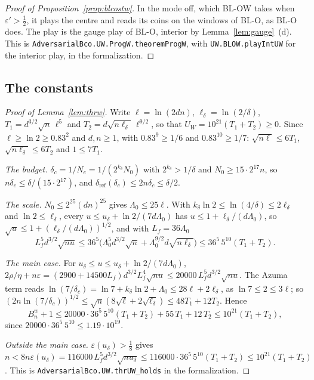 \documentclass[11pt]{amsart}
\theoremstyle{definition}
\numberwithin{equation}{section}
\begin{document}
\begin{proof}[Proof of Proposition~\ref{prop:blcostw}]
In the mode off, which BL-OW takes when $\varepsilon'>\frac12$, it plays the centre and reads its coins on the windows of BL-O, as BL-O does. The play is the gauge play of BL-O, interior by Lemma~\ref{lem:gauge}~(d). This is \texttt{AdversarialBco.\allowbreak UW.\allowbreak ProgW.\allowbreak theoremProgW}, with \texttt{UW.\allowbreak BLOW.\allowbreak playIntUW} for the interior play, in the formalization.
\end{proof}

\subsection*{The constants}

\begin{proof}[Proof of Lemma~\ref{lem:thrw}]
Write $\ell=\ln(2dn)$, $\ell_\delta=\ln(2/\delta)$, $T_1=d^{3/2}\sqrt n\,\ell^5$ and $T_2=d\sqrt{n\ell_\delta}\,\ell^{9/2}$, so that $U_W=10^{21}(T_1+T_2)\ge0$. Since $\ell\ge\ln2\ge0.83^2$ and $d,n\ge1$, with $0.83^9\ge1/6$ and $0.83^{10}\ge1/7$: $\sqrt{n\ell}\le6T_1$, $\sqrt{n\ell_\delta}\le6T_2$ and $1\le7T_1$.

\emph{The budget.} $\delta_c=1/N_e=1/(2^{k_\delta}N_0)$ with $2^{k_\delta}>1/\delta$ and $N_0\ge15\cdot2^{17}n$, so $n\delta_c\le\delta/(15\cdot2^{17})$, and $\delta_{\mathrm{ref}}(\delta_c)\le2n\delta_c\le\delta/2$.

\emph{The scale.} $N_0\le2^{25}(dn)^{25}$ gives $\Lambda_0\le25\ell$. With $k_\delta\ln2\le\ln(4/\delta)\le2\ell_\delta$ and $\ln2\le\ell_\delta$, every $u\le u_\delta+\ln2/(7d\Lambda_0)$ has $u\le1+\ell_\delta/(d\Lambda_0)$, so $\sqrt u\le1+(\ell_\delta/(d\Lambda_0))^{1/2}$, and with $L_f=36\Lambda_0$
\[
L_f^5d^{3/2}\sqrt{nu}\le36^5\bigl(\Lambda_0^5d^{3/2}\sqrt n+\Lambda_0^{9/2}d\sqrt{n\ell_\delta}\bigr)\le36^5\,5^{10}(T_1+T_2).
\]

\emph{The main case.} For $u_\delta\le u\le u_\delta+\ln2/(7d\Lambda_0)$, $2\rho/\eta+n\varepsilon=(2900+14500L_f)d^{3/2}L_f^4\sqrt{nu}\le20000\,L_f^5d^{3/2}\sqrt{nu}$. The Azuma term reads $\ln(7/\delta_c)=\ln7+k_\delta\ln2+\Lambda_0\le28\ell+2\ell_\delta$, as $\ln7\le2\le3\ell$; so $(2n\ln(7/\delta_c))^{1/2}\le\sqrt n(8\sqrt\ell+2\sqrt{\ell_\delta})\le48T_1+12T_2$. Hence
\[
B^w_n+1\le20000\cdot36^5\,5^{10}(T_1+T_2)+55\,T_1+12\,T_2\le10^{21}(T_1+T_2),
\]
since $20000\cdot36^5\,5^{10}\le1.19\cdot10^{19}$.

\emph{Outside the main case.} $\varepsilon(u_\delta)>\frac18$ gives $n<8n\varepsilon(u_\delta)=116000\,L_f^5d^{3/2}\sqrt{nu_\delta}\le116000\cdot36^5\,5^{10}(T_1+T_2)\le10^{21}(T_1+T_2)$. This is \texttt{AdversarialBco.\allowbreak UW.\allowbreak thrUW\_holds} in the formalization.
\end{proof}
\end{document}
